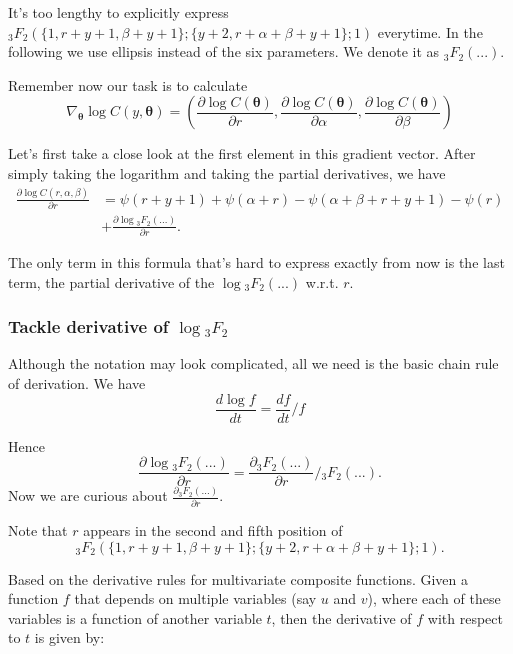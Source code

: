 \documentclass[11pt]{article}
\begin{document}
It's too lengthy to explicitly express ${}_3F_2(\{1,r+y +1,\beta +y +1\}; \{y +2,r+\alpha +\beta +y +1\};1)$ everytime. In the following we use ellipsis instead of the six parameters. We denote it as $_3F_2(...)$.


Remember now our task is to calculate
\begin{equation}
	\nabla _{\boldsymbol {\theta}}\log C(y,\boldsymbol\theta) = \left( \frac{\partial \log C(\boldsymbol {\theta})}{\partial r}, \frac{\partial \log C(\boldsymbol {\theta})}{\partial \alpha}, \frac{\partial \log C(\boldsymbol {\theta})}{\partial \beta} \right)
\end{equation}



Let's first take a close look at the first element in this gradient vector. After simply taking the logarithm and taking the partial derivatives, we have
\begin{equation}
\begin{aligned}
\frac{\partial \log C(r,\alpha,\beta)}{\partial r} &= \psi(r+y+1) + \psi(\alpha+r) - \psi(\alpha+\beta+r+y+1) - \psi(r) \\
&+ \frac{\partial \log {}_3F_2(...)}{\partial r}.
\end{aligned}
\end{equation}

The only term in this formula that's hard to express exactly from now is the last term, the partial derivative of the $\log {}_3F_2(...)$ w.r.t. $r$.

\subsubsection*{Tackle derivative of $\log {}_3F_2$}
Although the notation may look complicated, all we need is the basic chain rule of derivation. We have
\begin{equation}
	\frac{d \log f}{dt} = \frac{df}{dt} / f
\end{equation}

Hence
\begin{equation}
	\frac{\partial \log {}_3F_2(...)}{\partial r} =  \frac{\partial {}_3F_2(...)}{\partial r} /  {}_3F_2(...).
\end{equation}
Now we are curious about $\frac{\partial {}_3F_2(...)}{\partial r}$.

Note that $r$ appears in the second and fifth position of $${}_3F_2(\{1,r+y +1,\beta +y +1\}; \{y +2,r+\alpha +\beta +y +1\};1).$$ 

Based on the derivative rules for multivariate composite functions. Given a function \( f \) that depends on multiple variables (say \( u \) and \( v \)), where each of these variables is a function of another variable \( t \), then the derivative of \( f \) with respect to \( t \) is given by:
\end{document}
